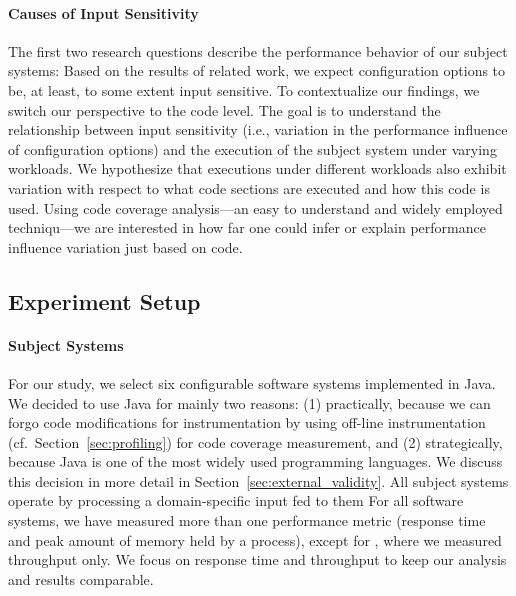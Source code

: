\paragraph{Causes of Input Sensitivity}
The first two research questions describe the performance behavior of our subject systems: Based on the results of related work, we expect configuration options to be, at least, to some extent input sensitive. To contextualize our findings, we switch our perspective to the code level. The goal is to understand the relationship between input sensitivity (i.e., variation in the performance influence of configuration options) and the execution of the subject system under varying workloads. We hypothesize that executions under different workloads also exhibit variation with respect to what code sections are executed and how this code is used. Using code coverage analysis---an easy to understand and widely employed techniqu---we are interested in how far one could infer or explain performance influence variation just based on code. 


\subsection{Experiment Setup}\label{sec:setup}
\paragraph{Subject Systems}
For our study, we select six configurable software systems implemented in Java. We decided to use Java for mainly two reasons: (1) practically, because we can forgo code modifications for instrumentation by using off-line instrumentation (cf.~Section~\ref{sec:profiling}) for code coverage measurement, and (2) strategically, because Java is one of the most widely used programming languages. We discuss this decision in more detail in Section~\ref{sec:external_validity}. 
All subject systems operate by processing a domain-specific input fed to them
For all software systems, we have measured more than one performance metric (response time and peak amount of memory held by a process), except for \htwo, where we measured throughput only. We focus on response time and throughput to keep our analysis and results comparable.

